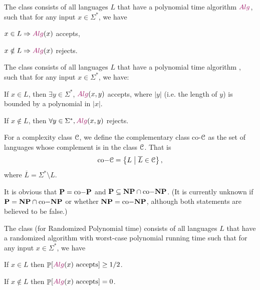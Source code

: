 \begin{defn}
    The class  consists of all languages $L$ that have a
    polynomial time algorithm $\Algorithm{Alg}$, such that for any
    input $x \in \Sigma^*$, we have
    \begin{compactenumA}
        \smallskip%
        \item $x \in L \Rightarrow \Algorithm{Alg}(x)$ accepts,
        \smallskip%
        \item $x \notin L \Rightarrow \Algorithm{Alg}(x)$ rejects.
    \end{compactenumA}
\end{defn}

\begin{defn}
    The class  consists of all languages $L$ that have a
    polynomial time algorithm \Alg, such that for any input
    $x \in \Sigma^*$, we have:
    \begin{compactenumi}
        \item If $x \in L$, then $\exists y \in \Sigma^*$,
        $\Alg(x,y)$ accepts, where $|y|$ (i.e. the length of $y$) is
        bounded by a polynomial in $|x|$.
     
        \item If $x \notin L$, then $ \forall y \in
        \Sigma^*, \Alg(x,y)$ rejects.
    \end{compactenumi}
\end{defn}

\begin{defn}
    For a complexity class $\EuScript{C}$, we define the complementary
    class co-$\EuScript{C}$ as the set of languages whose complement
    is in the class $\EuScript{C}$. That is 
    \begin{equation*}
        \mathrm{co-}\mathbf{\EuScript{C}} = \left\{ L \;\middle\vert\; \bigl.\smash{\overline{L}} \in \EuScript{C} \right\},
    \end{equation*}
    where $\overline{L} = \Sigma^* \setminus L$.
\end{defn}

It is obvious that $\mathbf{P} = \mathrm{co-}\mathbf{P}$ and $\mathbf{P}
\subseteq \mathbf{NP} \cap \mathrm{co-}\mathbf{NP}$. (It is currently unknown if
$\mathbf{P} = \mathbf{NP} \cap \mathrm{co-}\mathbf{NP}$ or whether
$\mathbf{NP}=\mathrm{co-}\mathbf{NP}$, although both statements are believed to be
false.)

\begin{defn}
    The class  (for Randomized Polynomial time) consists of
    all languages $L$ that have a randomized algorithm \Alg with worst-case
    polynomial running time such that for any input $x \in
    \Sigma^*$, we have
    \begin{compactenumi}
        \item If $x \in L$ then $\Prob{\Alg(x) \text{
              accepts}} \geq 1/2$.
     
        \item If $x \notin L$ then $\Prob{\Alg(x) \text{
              accepts}} = 0 $.
    \end{compactenumi}
\end{defn}


